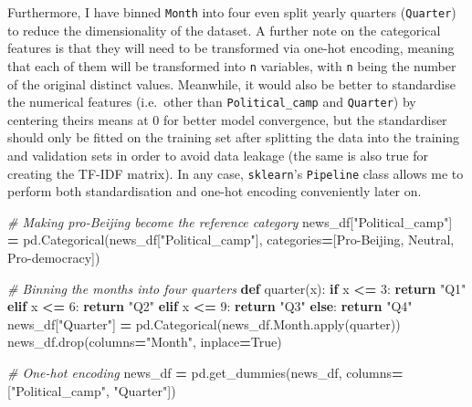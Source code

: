 \documentclass[a4paper, oneside]{report}
\newenvironment{Shaded}{\begin{snugshade}}{\end{snugshade}}
\newcommand{\BuiltInTok}[1]{#1}
\newcommand{\CommentTok}[1]{\textcolor[rgb]{0.56,0.35,0.01}{\textit{#1}}}
\newcommand{\ControlFlowTok}[1]{\textcolor[rgb]{0.13,0.29,0.53}{\textbf{#1}}}
\newcommand{\DecValTok}[1]{\textcolor[rgb]{0.00,0.00,0.81}{#1}}
\newcommand{\KeywordTok}[1]{\textcolor[rgb]{0.13,0.29,0.53}{\textbf{#1}}}
\newcommand{\NormalTok}[1]{#1}
\newcommand{\OperatorTok}[1]{\textcolor[rgb]{0.81,0.36,0.00}{\textbf{#1}}}
\newcommand{\StringTok}[1]{\textcolor[rgb]{0.31,0.60,0.02}{#1}}
\newcommand{\VariableTok}[1]{\textcolor[rgb]{0.00,0.00,0.00}{#1}}
\renewenvironment{Shaded}
{
  \vspace{4pt}%
  \begin{snugshade}%
}{%
  \end{snugshade}%
  \vspace{4pt}%
}
\begin{document}
Furthermore, I have binned \texttt{Month} into four even split yearly
quarters (\texttt{Quarter}) to reduce the dimensionality of the dataset.
A further note on the categorical features is that they will need to be
transformed via one-hot encoding, meaning that each of them will be
transformed into \texttt{n} variables, with \texttt{n} being the number
of the original distinct values. Meanwhile, it would also be better to
standardise the numerical features (i.e.~other than
\texttt{Political\_camp} and \texttt{Quarter}) by centering theirs means
at 0 for better model convergence, but the standardiser should only be
fitted on the training set after splitting the data into the training
and validation sets in order to avoid data leakage (the same is also
true for creating the TF-IDF matrix). In any case, \texttt{sklearn}'s
\texttt{Pipeline} class allows me to perform both standardisation and
one-hot encoding conveniently later on.

\begin{Shaded}
\begin{Highlighting}[]
\CommentTok{\# Making pro{-}Beijing become the reference category}
\NormalTok{news\_df[}\StringTok{"Political\_camp"}\NormalTok{] }\OperatorTok{=}\NormalTok{ pd.Categorical(news\_df[}\StringTok{"Political\_camp"}\NormalTok{], categories}\OperatorTok{=}\NormalTok{[}\StringTok{\textquotesingle{}Pro{-}Beijing\textquotesingle{}}\NormalTok{, }\StringTok{\textquotesingle{}Neutral\textquotesingle{}}\NormalTok{, }\StringTok{\textquotesingle{}Pro{-}democracy\textquotesingle{}}\NormalTok{])  }

\CommentTok{\# Binning the months into four quarters}
\KeywordTok{def}\NormalTok{ quarter(x):}
  \ControlFlowTok{if}\NormalTok{ x }\OperatorTok{\textless{}=} \DecValTok{3}\NormalTok{:}
    \ControlFlowTok{return} \StringTok{"Q1"}
  \ControlFlowTok{elif}\NormalTok{ x }\OperatorTok{\textless{}=} \DecValTok{6}\NormalTok{:}
    \ControlFlowTok{return} \StringTok{"Q2"}
  \ControlFlowTok{elif}\NormalTok{ x }\OperatorTok{\textless{}=} \DecValTok{9}\NormalTok{:}
    \ControlFlowTok{return} \StringTok{"Q3"}
  \ControlFlowTok{else}\NormalTok{:}
    \ControlFlowTok{return} \StringTok{"Q4"}
\NormalTok{news\_df[}\StringTok{"Quarter"}\NormalTok{] }\OperatorTok{=}\NormalTok{ pd.Categorical(news\_df.Month.}\BuiltInTok{apply}\NormalTok{(quarter))}
\NormalTok{news\_df.drop(columns}\OperatorTok{=}\StringTok{"Month"}\NormalTok{, inplace}\OperatorTok{=}\VariableTok{True}\NormalTok{)}

\CommentTok{\# One{-}hot encoding}
\NormalTok{news\_df }\OperatorTok{=}\NormalTok{ pd.get\_dummies(news\_df, columns}\OperatorTok{=}\NormalTok{[}\StringTok{"Political\_camp"}\NormalTok{, }\StringTok{"Quarter"}\NormalTok{])}
\end{Highlighting}
\end{Shaded}
\end{document}
